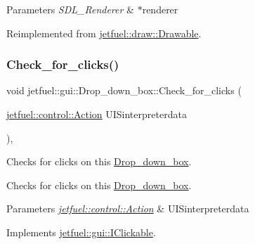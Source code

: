\begin{DoxyParams}{Parameters}
{\em S\+D\+L\+\_\+\+Renderer} & $\ast$renderer \\
\hline
\end{DoxyParams}


Reimplemented from \hyperlink{classjetfuel_1_1draw_1_1Drawable_a0d7257f197d6ffcdd89c3a99c93d1400}{jetfuel\+::draw\+::\+Drawable}.

\mbox{\label{classjetfuel_1_1gui_1_1Drop__down__box_ae3607405b7e3fe981da75f0529e0a7a1}} 
\subsubsection{\texorpdfstring{Check\+\_\+for\+\_\+clicks()}{Check\_for\_clicks()}}
{\footnotesize\ttfamily void jetfuel\+::gui\+::\+Drop\+\_\+down\+\_\+box\+::\+Check\+\_\+for\+\_\+clicks (\begin{DoxyParamCaption}\item[{\hyperlink{structjetfuel_1_1control_1_1Action}{jetfuel\+::control\+::\+Action}}]{U\+I\+Sinterpreterdata }\end{DoxyParamCaption})\hspace{0.3cm}{\ttfamily [override]}, {\ttfamily [virtual]}}



Checks for clicks on this \hyperlink{classjetfuel_1_1gui_1_1Drop__down__box}{Drop\+\_\+down\+\_\+box}. 

Checks for clicks on this \hyperlink{classjetfuel_1_1gui_1_1Drop__down__box}{Drop\+\_\+down\+\_\+box}.


\begin{DoxyParams}{Parameters}
{\em \hyperlink{structjetfuel_1_1control_1_1Action}{jetfuel\+::control\+::\+Action}} & U\+I\+Sinterpreterdata \\
\hline
\end{DoxyParams}


Implements \hyperlink{classjetfuel_1_1gui_1_1IClickable_aea45de37bd3beb7eb7e2e3056e4e37b3}{jetfuel\+::gui\+::\+I\+Clickable}.

\mbox{\label{classjetfuel_1_1gui_1_1Drop__down__box_a1b62cab3674f45700ad9afd6076a8cb1}} 
